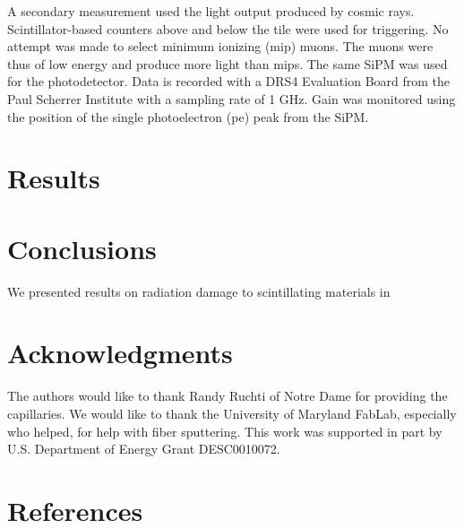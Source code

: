 \documentclass[review]{elsarticle}
\begin{document}
A secondary measurement used the
light output produced by cosmic rays.
Scintillator-based counters above and below the tile were used for triggering.
No attempt was made to select minimum ionizing (mip) muons.  The muons were thus
of low energy and produce more light than mips.
The same SiPM was used for the photodetector.  Data is recorded with a
DRS4 Evaluation Board from the Paul Scherrer Institute with a sampling
rate of 1 GHz.  Gain was monitored using the position of the single
photoelectron (pe) peak from the SiPM.

\section{Results}
\label{sec:Results}


\section{Conclusions}
\label{sec:Conclusions}

We presented results on radiation damage to scintillating materials
in 


\section{Acknowledgments}
The authors would like to thank Randy Ruchti of Notre Dame for
providing the capillaries.
 We would like to thank the University of Maryland
FabLab, especially {\color{red} who helped}, for help with fiber sputtering.
This work was supported in part by U.S. Department of Energy
Grant DESC0010072.

\section*{References}


\end{document}
